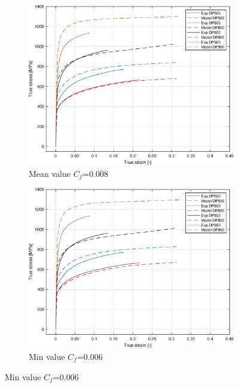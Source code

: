 \documentclass{article}
\begin{document}
\begin{figure}[h!]
     \centering
     \begin{subfigure}[b]{0.3\textwidth}
         \centering
         \includegraphics[width=\textwidth]{MeanMean.eps}
         \caption{Mean value $C_f$=0.008}
         \label{fig:CarbonMean}
     \end{subfigure}
     \hfill
     \begin{subfigure}[b]{0.3\textwidth}
         \centering
         \includegraphics[width=\textwidth]{CarbonMin.eps}
         \caption{Min value $C_f$=0.006}
         \label{fig:CarbonMin}
     \end{subfigure}

\end{figure}
\end{document}
